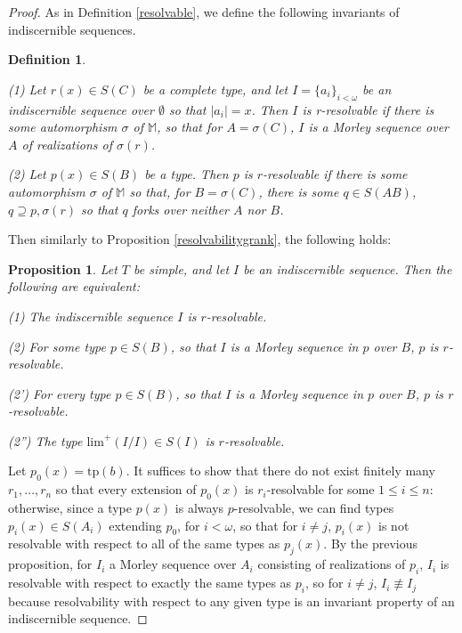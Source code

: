 \documentclass[10pt,a4paper]{amsart}
\newtheorem{definition}{Definition}
\newtheorem{prop}{Proposition}
\begin{document}
\begin{proof}
    As in Definition \ref{resolvable}, we define the following invariants of indiscernible sequences.

    \begin{definition}
        \label{qresolvable}

        (1) Let $r(x) \in S(C)$ be a complete type, and let $I=\{a_{i}\}_{i < \omega}$ be an indiscernible sequence over $\emptyset$ so that $|a_{i}|= x$. Then $I$ is \textit{r}-resolvable if there is some automorphism $\sigma$ of $\mathbb{M}$, so that for $A = \sigma(C)$, $I$ is a Morley sequence over $A$ of realizations of $\sigma(r)$.  

        (2) Let $p(x) \in S(B)$ be a type. Then $p$ is \emph{$r$-resolvable} if there is some automorphism $\sigma$ of $\mathbb{M}$ so that, for $B = \sigma(C)$, there is some  $ q \in S(AB)$, $q \supseteq p, \sigma(r)$ so that $q$ forks over neither $A$ nor $B$.
    \end{definition}


Then similarly to Proposition \ref{resolvabilitygrank}, the following holds:

\begin{prop}\label{resolvabilitygrank2}
    Let $T$ be simple, and let $I$ be an indiscernible sequence. Then the following are equivalent:

    (1) The indiscernible sequence $I$ is $r$-resolvable.

    (2) For some type $p \in S(B)$, so that $I$ is a Morley sequence in $p$ over $B$, $p$ is $r$-resolvable.

    (2') For every type $p \in S(B)$, so that $I$ is a Morley sequence in $p$ over $B$, $p$ is $r$-resolvable.

    (2'') The type $\mathrm{lim}^{+}(I/I) \in S(I)$ is $r$-resolvable.

    
\end{prop}

Let $p_{0}(x) = \mathrm{tp}(b)$. It suffices to show that there do not exist finitely many $r_{1}, \ldots, r_{n}$ so that every extension of $p_{0}(x)$ is $r_{i}$-resolvable for some $1 \leq i \leq n$: otherwise, since a type $p(x)$ is always $p$-resolvable, we can find types $p_{i}(x) \in S(A_{i})$ extending $p_{0}$, for $i < \omega$, so that for $i \neq j$, $p_{i}(x)$ is not resolvable with respect to all of the same types as $p_{j}(x)$. By the previous proposition, for $I_{i}$ a Morley sequence over $A_{i}$ consisting of realizations of $p_{i}$, $I_{i}$ is resolvable with respect to exactly the same types as $p_{i}$, so for $i \neq j$, $I_{i} \not \equiv I_{j}$ because resolvability with respect to any given type is an invariant property of an indiscernible sequence.



\end{proof}
\end{document}
